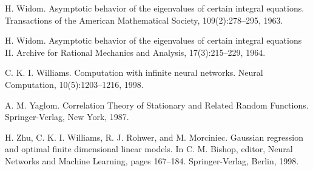 \documentclass[11pt]{book}
\begin{document}
\begin{thebibliography}{99}
 H. Widom. Asymptotic behavior of the eigenvalues of certain integral equations. Transactions of the American Mathematical Society, 109(2):278--295, 1963.

 H. Widom. Asymptotic behavior of the eigenvalues of certain integral equations II. Archive for Rational Mechanics and Analysis, 17(3):215--229, 1964.

 C. K. I. Williams. Computation with infinite neural networks. Neural Computation, 10(5):1203--1216, 1998.

 A. M. Yaglom. Correlation Theory of Stationary and Related Random Functions. Springer-Verlag, New York, 1987.

 H. Zhu, C. K. I. Williams, R. J. Rohwer, and M. Morciniec. Gaussian regression and optimal finite dimensional linear models. In C. M. Bishop, editor, Neural Networks and Machine Learning, pages 167--184. Springer-Verlag, Berlin, 1998.
\end{thebibliography}
\end{document}
